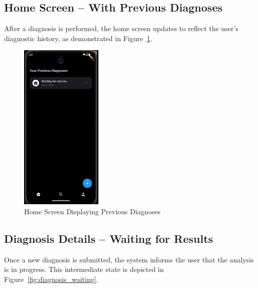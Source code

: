 \subsection{Home Screen – With Previous Diagnoses}

After a diagnosis is performed, the home screen updates to reflect the user's diagnostic history, as demonstrated in Figure~\ref{fig:home_screen_with_history}.

\begin{figure}[H]
    \centering
    \includegraphics[width=0.35\textwidth]{images/UI_Screenshots/home_screen_with_previous_diagnoses.png}
    \caption{Home Screen Displaying Previous Diagnoses}
    \label{fig:home_screen_with_history}
\end{figure}

\subsection{Diagnosis Details – Waiting for Results}

Once a new diagnosis is submitted, the system informs the user that the analysis is in progress. This intermediate state is depicted in Figure~\ref{fig:diagnosis_waiting}.

